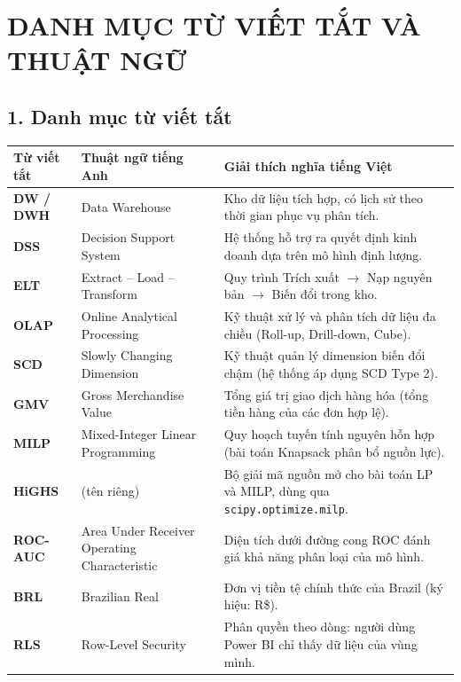 \section*{DANH MỤC TỪ VIẾT TẮT VÀ THUẬT NGỮ}

\subsection*{1. Danh mục từ viết tắt}
\begin{xltabular}{\textwidth}{|>{\raggedright\arraybackslash}m{2.5cm}|>{\raggedright\arraybackslash}m{5cm}|L|}
\hline
\textbf{Từ viết tắt} & \textbf{Thuật ngữ tiếng Anh} & \textbf{Giải thích nghĩa tiếng Việt} \\
\hline
\endhead
\textbf{DW / DWH} & Data Warehouse & Kho dữ liệu tích hợp, có lịch sử theo thời gian phục vụ phân tích. \\
\hline
\textbf{DSS} & Decision Support System & Hệ thống hỗ trợ ra quyết định kinh doanh dựa trên mô hình định lượng. \\
\hline
\textbf{ELT} & Extract -- Load -- Transform & Quy trình Trích xuất $\rightarrow$ Nạp nguyên bản $\rightarrow$ Biến đổi trong kho. \\
\hline
\textbf{OLAP} & Online Analytical Processing & Kỹ thuật xử lý và phân tích dữ liệu đa chiều (Roll-up, Drill-down, Cube). \\
\hline
\textbf{SCD} & Slowly Changing Dimension & Kỹ thuật quản lý dimension biến đổi chậm (hệ thống áp dụng SCD Type 2). \\
\hline
\textbf{GMV} & Gross Merchandise Value & Tổng giá trị giao dịch hàng hóa (tổng tiền hàng của các đơn hợp lệ). \\
\hline
\textbf{MILP} & Mixed-Integer Linear Programming & Quy hoạch tuyến tính nguyên hỗn hợp (bài toán Knapsack phân bổ nguồn lực). \\
\hline
\textbf{HiGHS} & (tên riêng) & Bộ giải mã nguồn mở cho bài toán LP và MILP, dùng qua \texttt{scipy.optimize.milp}. \\
\hline
\textbf{ROC-AUC} & Area Under Receiver Operating Characteristic & Diện tích dưới đường cong ROC đánh giá khả năng phân loại của mô hình. \\
\hline
\textbf{BRL} & Brazilian Real & Đơn vị tiền tệ chính thức của Brazil (ký hiệu: R\$). \\
\hline
\textbf{RLS} & Row-Level Security & Phân quyền theo dòng: người dùng Power BI chỉ thấy dữ liệu của vùng mình. \\

\end{xltabular}

